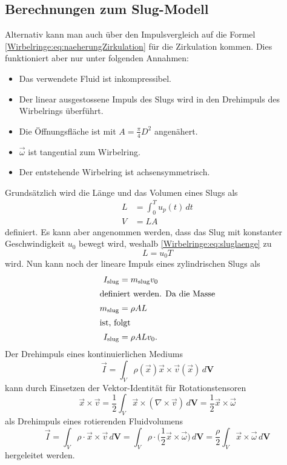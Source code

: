\subsection{Berechnungen zum Slug-Modell}
Alternativ kann man auch über den Impulsvergleich auf die Formel \eqref{Wirbelringe:eq:naeherungZirkulation} für die Zirkulation kommen.
Dies funktioniert aber nur unter folgenden Annahmen:
\begin{itemize}
    \item Das verwendete Fluid ist inkompressibel.
    \item Der linear ausgestossene Impuls des Slugs wird in den Drehimpuls des Wirbelrings überführt.
    \item Die Öffnungsfläche ist mit \(A = \frac{\pi}{4} D^2\) angenähert.
    \item \(\vec{\omega}\) ist tangential zum Wirbelring.
    \item Der entstehende Wirbelring ist achsensymmetrisch.
\end{itemize} 

Grundsätzlich wird die Länge und das Volumen eines Slugs als
\begin{align}
    \label{Wirbelringe:eq:sluglaenge}
    L
    &=
    \int_{0}^{T}u_p(t)\,dt\\
    V
    &=
    LA
\end{align}
definiert.
Es kann aber angenommen werden, dass das Slug mit konstanter Geschwindigkeit \(u_0\) bewegt wird, weshalb \eqref{Wirbelringe:eq:sluglaenge} zu
\begin{equation}
    L
    =
    u_0T
\end{equation}
wird.
Nun kann noch der lineare Impuls eines zylindrischen Slugs als
\begin{align}
    I_{\text{slug}}
    &=
    m_{\text{slug}}v_0\\
    \intertext{definiert werden. Da die Masse}
    m_{\text{slug}}
    &=
    \rho AL\\
    \intertext{ist, folgt}
    I_{\text{slug}}
    &=
    \rho ALv_0
    \label{Wirbelringe:eq:slugImp}.
\end{align}
Der Drehimpuls eines kontinuierlichen Mediums
\begin{equation*}
    \vec{I}
    =
    \int_{V}\rho(\vec{x})\vec{x}\times\vec{v}(\vec{x})\,d\mathbf{V}
\end{equation*}
kann durch Einsetzen der Vektor-Identität für Rotationstensoren \cite{Wirbelringe:batchelor1967}
\begin{equation*}
    \vec{x}\times\vec{v}
    =
    \frac{1}{2}\int_{V}\vec{x}\times(\nabla\times\vec{v})\,d\mathbf{V}
    =
    \frac{1}{2}\vec{x}\times\vec{\omega}
\end{equation*}
als Drehimpuls eines rotierenden Fluidvolumens 
\begin{equation}
    \vec{I}
    =
    \int_{V}\rho\cdot\vec{x}\times\vec{v}\,d\mathbf{V}
    =
    \int_{V}\rho\cdot\biggl({\textstyle \frac{1}{2}}\vec{x}\times\vec{\omega}\biggr)\,d\mathbf{V}
    =
    \frac{\rho}{2}\int_{V}\vec{x}\times\vec{\omega}\,d\mathbf{V}
    \label{Wirbelringe:eq:Drehimpuls}
\end{equation}
hergeleitet werden. 

